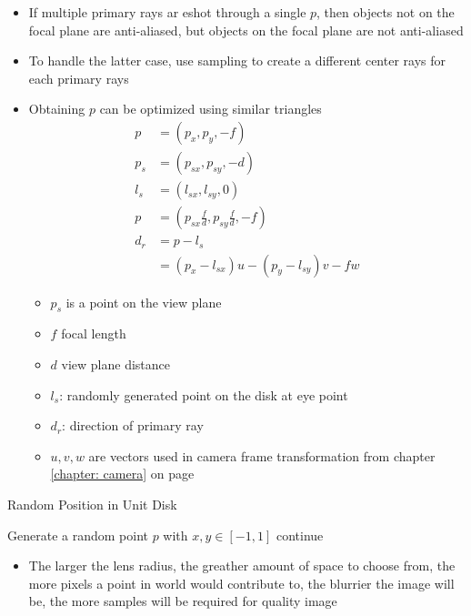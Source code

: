     \begin{itemize}
      \item If multiple primary rays ar eshot through a single $ p $, then
      objects not on the focal plane are anti-aliased, but objects on the focal
      plane are not anti-aliased
      \item To handle the latter case, use sampling to create a different
      center rays for each primary rays
      \item Obtaining $ p $ can be optimized using similar triangles
      \begin{align}
        p &= \left( p_{x}, p_{y}, -f \right) \\
        p_{s} &= \left( p_{sx}, p_{sy}, -d \right) \\
        l_{s} &= \left( l_{sx}, l_{sy}, 0 \right) \\
        p &= \left( p_{sx} \frac{f}{d}, p_{sy} \frac{f}{d}, -f \right) \\
        d_{r} &= p - l_{s} \\
        &= \left( p_{x} - l_{sx} \right) u
          - \left( p_{y} - l_{sy} \right) v
          - fw
      \end{align}
      \begin{itemize}
        \item $ p_{s} $ is a point on the view plane
        \item $ f $ focal length
        \item $ d $ view plane distance
        \item $ l_{s} $: randomly generated point on the disk at eye point
        \item $ d_{r} $: direction of primary ray
        \item $ u, v, w $ are vectors used in camera frame transformation
        from chapter \ref{chapter: camera} on page \pageref{chapter: camera}
      \end{itemize}

    \end{itemize}

    \begin{algorithm}
      \caption{Random Position in Unit Disk}
       {
         {
          Generate a random point $ p $ with $ x, y \in \left[ -1, 1 \right] $\;
           {
            continue\;
          }

        }
      }
    \end{algorithm}

    \begin{itemize}
      \item The larger the lens radius, the greather amount of space to choose
      from, the more pixels a point in world would contribute to, the blurrier
      the image will be, the more samples will be required for quality image
    \end{itemize}
